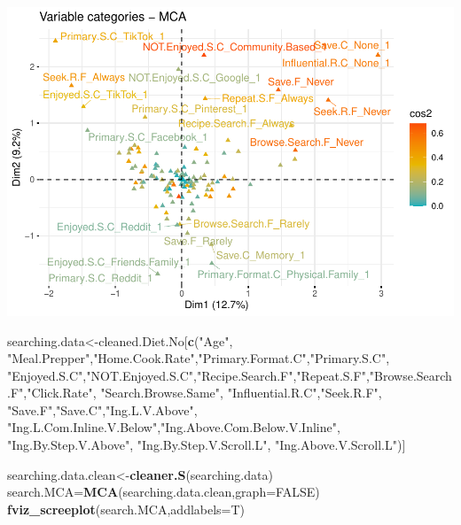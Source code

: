 \documentclass[
]{article}
\newenvironment{Shaded}{\begin{snugshade}}{\end{snugshade}}
\newcommand{\DataTypeTok}[1]{\textcolor[rgb]{0.13,0.29,0.53}{#1}}
\newcommand{\KeywordTok}[1]{\textcolor[rgb]{0.13,0.29,0.53}{\textbf{#1}}}
\newcommand{\NormalTok}[1]{#1}
\newcommand{\OtherTok}[1]{\textcolor[rgb]{0.56,0.35,0.01}{#1}}
\newcommand{\StringTok}[1]{\textcolor[rgb]{0.31,0.60,0.02}{#1}}
\begin{document}
\includegraphics{Average-User-MCA_files/figure-latex/diet yes search-3.pdf}

\begin{Shaded}
\begin{Highlighting}[]
\NormalTok{searching.data<-cleaned.Diet.No[}\KeywordTok{c}\NormalTok{(}\StringTok{"Age"}\NormalTok{, }\StringTok{"Meal.Prepper"}\NormalTok{,}\StringTok{"Home.Cook.Rate"}\NormalTok{,}\StringTok{"Primary.Format.C"}\NormalTok{,}\StringTok{"Primary.S.C"}\NormalTok{,}
            \StringTok{"Enjoyed.S.C"}\NormalTok{,}\StringTok{"NOT.Enjoyed.S.C"}\NormalTok{,}\StringTok{"Recipe.Search.F"}\NormalTok{,}\StringTok{"Repeat.S.F"}\NormalTok{,}\StringTok{"Browse.Search.F"}\NormalTok{,}\StringTok{"Click.Rate"}\NormalTok{,}
            \StringTok{"Search.Browse.Same"}\NormalTok{, }\StringTok{"Influential.R.C"}\NormalTok{,}\StringTok{"Seek.R.F"}\NormalTok{, }\StringTok{"Save.F"}\NormalTok{,}\StringTok{"Save.C"}\NormalTok{,}\StringTok{"Ing.L.V.Above"}\NormalTok{,}
            \StringTok{"Ing.L.Com.Inline.V.Below"}\NormalTok{,}\StringTok{"Ing.Above.Com.Below.V.Inline"}\NormalTok{,  }\StringTok{"Ing.By.Step.V.Above"}\NormalTok{,  }\StringTok{"Ing.By.Step.V.Scroll.L"}\NormalTok{,}
            \StringTok{"Ing.Above.V.Scroll.L"}\NormalTok{)]}

\NormalTok{searching.data.clean<-}\KeywordTok{cleaner.S}\NormalTok{(searching.data)}
\NormalTok{search.MCA=}\KeywordTok{MCA}\NormalTok{(searching.data.clean,}\DataTypeTok{graph=}\OtherTok{FALSE}\NormalTok{)}
\KeywordTok{fviz_screeplot}\NormalTok{(search.MCA,}\DataTypeTok{addlabels=}\NormalTok{T)}
\end{Highlighting}
\end{Shaded}
\end{document}
